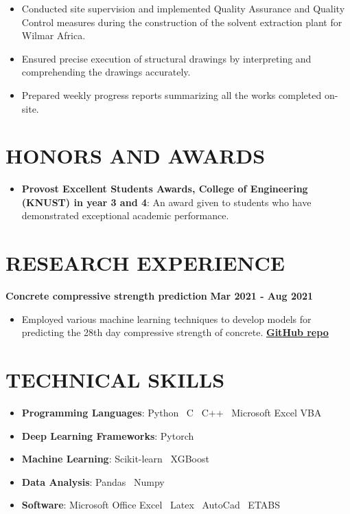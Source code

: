 \documentclass[letterpaper, 12pt]{article}
\newcommand{\cvsection}[1]{
	
	\section*{#1}
}
\begin{document}
	\begin{itemize}[leftmargin=*]
		
		\item Conducted site supervision and implemented Quality Assurance and Quality Control measures during the construction of the solvent extraction plant for Wilmar Africa.	
		\item Ensured precise execution of structural drawings by interpreting and comprehending the drawings accurately.
		\item Prepared weekly progress reports summarizing all the works completed on-site.
		
	\end{itemize}
	
	
	\cvsection{HONORS AND AWARDS}
	
	\begin{itemize}[leftmargin=*]
		
		\item \textbf{Provost Excellent Students Awards, College of Engineering (KNUST) in year 3 and 4}: An award given to students who have demonstrated exceptional academic performance.
		
	\end{itemize}
	
	
	\cvsection{RESEARCH EXPERIENCE}
	
	\textbf{Concrete compressive strength prediction} \hfill \textbf{Mar 2021 - Aug 2021}
	
	\begin{itemize}[leftmargin=*]
		
		\item Employed various machine learning techniques to develop models for predicting the 28th day compressive strength of concrete. \href{https://www.github.com/patrickboateng/compressive-strength-prediction}{\underline{\textbf{GitHub repo}}}
		
	\end{itemize}
	
	
	\cvsection{TECHNICAL SKILLS}
	
	\begin{itemize}[leftmargin=*]
		
		\item \textbf{Programming Languages}: Python \vrule \, C \vrule \, C++ \vrule \, Microsoft Excel VBA
		\item \textbf{Deep Learning Frameworks}: Pytorch
		\item \textbf{Machine Learning}: Scikit-learn \vrule \, XGBoost
		\item \textbf{Data Analysis}: Pandas \vrule \, Numpy
		\item \textbf{Software}: Microsoft Office Excel \vrule \, Latex \vrule \, AutoCad \vrule \, ETABS
		
	\end{itemize}
	
\end{document}
